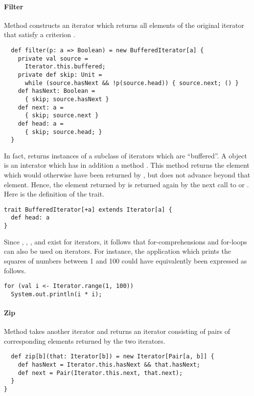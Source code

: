 {\paragraph{Filter} Method  constructs an iterator which
returns all elements of the original iterator that satisfy a criterion
.
\begin{lstlisting}
  def filter(p: a => Boolean) = new BufferedIterator[a] {
    private val source = 
      Iterator.this.buffered;
    private def skip: Unit = 
      while (source.hasNext && !p(source.head)) { source.next; () }
    def hasNext: Boolean = 
      { skip; source.hasNext }
    def next: a = 
      { skip; source.next }
    def head: a = 
      { skip; source.head; }
  }
\end{lstlisting}
In fact,  returns instances of a subclass of iterators
which are ``buffered''.  A  object is an
interator which has in addition a method . This method
returns the element which would otherwise have been returned by
, but does not advance beyond that element. Hence, the
element returned by  is returned again by the next call to
 or . Here is the definition of the
 trait.
\begin{lstlisting}
trait BufferedIterator[+a] extends Iterator[a] {
  def head: a
}
\end{lstlisting}
Since , , , and 
exist for iterators, it follows that for-comprehensions and for-loops
can also be used on iterators. For instance, the application which prints the squares of numbers between 1 and 100 could have equivalently been expressed as follows.
\begin{lstlisting}
for (val i <- Iterator.range(1, 100))
  System.out.println(i * i);
\end{lstlisting}

\paragraph{Zip} Method  takes another iterator and
returns an iterator consisting of pairs of corresponding elements
returned by the two iterators.
\begin{lstlisting}
  def zip[b](that: Iterator[b]) = new Iterator[Pair[a, b]] {
    def hasNext = Iterator.this.hasNext && that.hasNext;
    def next = Pair(Iterator.this.next, that.next);
  }
}
\end{lstlisting}

}
